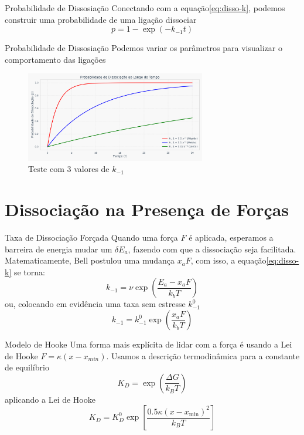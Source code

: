 \documentclass[aspectratio=169]{beamer}
\begin{document}
\begin{frame}{Probabilidade de Dissosiação}
    Conectando com a equação\eqref{eq:disso-k}, podemos construir uma probabilidade de uma ligação dissociar
    \begin{equation}
        p = 1 - \exp (-k_{-1} t)
    \end{equation}
\end{frame}

\begin{frame}{Probabilidade de Dissosiação}
    Podemos variar os parâmetros para visualizar o comportamento das ligações
    \begin{figure}
        \includegraphics[width=0.7\textwidth]{img/prob_diss_tempo.png}
        \caption{Teste com 3 valores de $k_{-1}$}
    \end{figure}
\end{frame}

\section{Dissociação na Presença de Forças}

\begin{frame}{Taxa de Dissociação Forçada}
    Quando uma força $F$ é aplicada, esperamos a barreira de energia mudar um $\delta E_{a}$,
    fazendo com que a dissociação seja facilitada. Matematicamente, Bell postulou uma mudança $x_{a}F$,
    com isso, a equação\eqref{eq:disso-k} se torna:
    \begin{equation}
        k_{-1} = \nu \exp \left( \frac{E_{a} - x_{a}F}{k_{b} T} \right)
    \end{equation}
    ou, colocando em evidência uma taxa sem estresse $k_{-1}^{0}$
    \begin{equation}\label{eq:stressed-disso-k}
        k_{-1} = k_{-1}^{0} \exp \left( \frac{x_{a}F}{k_{b} T} \right)
    \end{equation}
\end{frame}

\begin{frame}{Modelo de Hooke}
    Uma forma mais explícita de lidar com a força é usando a Lei de Hooke $F = \kappa (x - x_{min})$.
    Usamos a descrição termodinâmica para a constante de equilíbrio
    \begin{equation}
        K_D = \exp \left(\frac{\Delta G}{k_B T} \right)
    \end{equation}
    aplicando a Lei de Hooke
    \begin{equation}
        K_{D} = K_{D}^{0} \exp \left[\frac{0.5 \kappa (x-x_{\min})^2}{k_{B} T}\right]
    \end{equation}
\end{frame}
\end{document}
